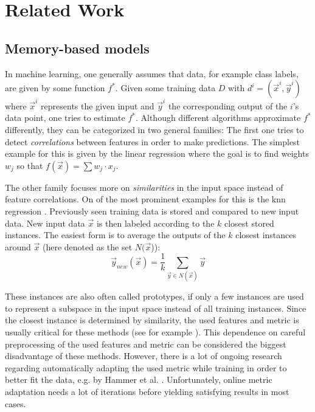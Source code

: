 \chapter{Related Work \label{chap:stateOfTheArt}}



\section{Memory-based models}

In machine learning, one generally assumes that data, for example class labels, are given by some function $f^*$. Given some training data $D$ with $d^i =(\vec{x}^i,\vec{y}^i)$ where $\vec{x}^i$ represents the given input and $\vec{y}^i$ the corresponding output of the $i$'s data point, one tries to estimate $f^*$. 
Although different algorithms approximate $f^*$ differently, they can be categorized in two general families: The first one tries to detect \textit{correlations} between features in order to make predictions. The simplest example for this is given by the linear regression \cite{linearRegression} where the goal is to find weights $w_j$ so that $f(\vec{x}) = \sum w_j \cdot x_j$. 

The other family focuses more on \textit{similarities} in the input space instead of feature correlations. On of the most prominent examples for this is the \gls{knn} regression \cite{kibler1987learning}. Previously seen training data is stored and compared to new input data. New input data $\vec{x}$ is then labeled according to the $k$ closest stored instances. The easiest form is to average the outputs of the $k$ closest instances around $\vec{x}$ (here denoted as the set $N(\vec{x}$)):
\begin{equation}
\vec{y}_{new}(\vec{x}) = \frac{1}{k} \sum_{\vec{y} \in N(\vec{x})} \vec{y}
\end{equation}

These instances are also often called prototypes, if only a few instances are used to represent a subspace in the input space instead of all training instances. Since the closest instance is determined by similarity, the used features and metric is usually critical for these methods (see for example \cite{metric1, metric2}). This dependence on careful preprocessing of the used features and metric can be considered the biggest disadvantage of these methods. However, there is a lot of ongoing research regarding automatically adapting the used metric while training in order to better fit the data, e.g. by Hammer et al. \cite{lvq}. Unfortunately, online metric adaptation needs a lot of iterations before yielding satisfying results in most cases. 

